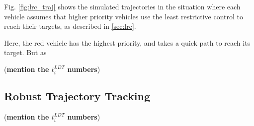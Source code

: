 Fig. \ref{fig:lrc_traj} shows the simulated trajectories in the situation where each vehicle assumes that higher priority vehicles use the least restrictive control to reach their targets, as described in \ref{sec:lrc}. 

Here, the red vehicle has the highest priority, and takes a quick path to reach its target. But as 



(\textbf{mention the $t_i^{LDT}$ numbers})

\subsection{Robust Trajectory Tracking}
%
(\textbf{mention the $t_i^{LDT}$ numbers})
